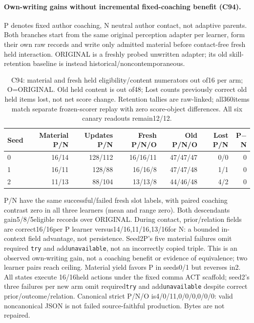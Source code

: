 \documentclass[11pt]{article}
\begin{document}
\paragraph{Own-writing gains without incremental fixed-coaching benefit (C94).}
P denotes fixed author coaching, N neutral author contact, not adaptive parents.
Both branches start from the same original perception adapter per learner,
form their own raw records and write only admitted material before contact-free
fresh held interaction. ORIGINAL is a freshly probed unwritten adapter; its
old skill-retention baseline is instead historical/noncontemporaneous.
\begin{table}[htbp]
\centering\small
\begin{tabular}{lrrrrrr}
\toprule
Seed & Material P/N & Updates P/N & Fresh P/N/O & Old P/N/O & Lost P/N & P$-$N \\
\midrule
0 & 16/14 & 128/112 & 16/16/11 & 47/47/47 & 0/0 & 0 \\
1 & 16/11 & 128/88 & 16/16/8 & 47/47/48 & 1/1 & 0 \\
2 & 11/13 & 88/104 & 13/13/8 & 44/46/48 & 4/2 & 0 \\
\bottomrule
\end{tabular}
\caption{C94: material and fresh held eligibility/content numerators out of16
per arm; O=ORIGINAL. Old held content is out of48; Lost counts previously correct
old held items lost, not net score change. Retention tallies are raw-linked;
all360items match separate frozen-scorer replay with zero score-object differences.
All six canary readouts remain12/12.}
\label{tab:seq158-coaching}
\end{table}
P/N have the same successful/failed fresh slot labels, with paired coaching
contrast zero in all three learners (mean and range zero). Both descendants
gain5/8/5eligible records over ORIGINAL. During contact, prior/relation fields
are correct16/16per P learner versus14/16,11/16,13/16for N: a bounded in-context
field advantage, not persistence. Seed2P's five material failures omit required
\texttt{try} and add\texttt{unavailable}, not an incorrectly copied triple.
This is an observed own-writing gain,
not a coaching benefit or evidence of equivalence; two learner pairs reach
ceiling. Material yield favors P in seeds0/1 but reverses in2. All states execute
16/16held actions under the fixed comma ACT scaffold; seed2's three failures
per new arm omit required\texttt{try} and add\texttt{unavailable} despite correct
prior/outcome/relation. Canonical strict P/N/O is4/0/11,0/0/0,0/0/0: valid
noncanonical JSON is not failed source-faithful production. Bytes are not repaired.
\end{document}
